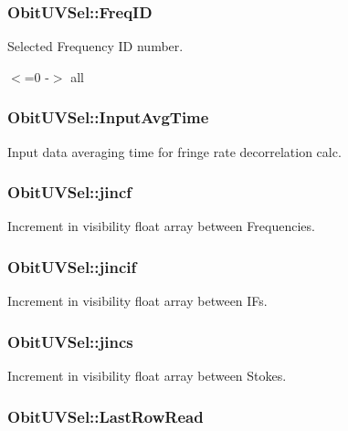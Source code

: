 \subsubsection{ {\bf Obit\-UVSel::Freq\-ID}}\label{structObitUVSel_o19}


Selected Frequency ID number. 

$<$=0 -$>$ all 
\subsubsection{ {\bf Obit\-UVSel::Input\-Avg\-Time}}\label{structObitUVSel_o57}


Input data averaging time for fringe rate decorrelation calc. 

\subsubsection{ {\bf Obit\-UVSel::jincf}}\label{structObitUVSel_o14}


Increment in visibility float array between Frequencies. 

\subsubsection{ {\bf Obit\-UVSel::jincif}}\label{structObitUVSel_o17}


Increment in visibility float array between IFs. 

\subsubsection{ {\bf Obit\-UVSel::jincs}}\label{structObitUVSel_o11}


Increment in visibility float array between Stokes. 

\subsubsection{ {\bf Obit\-UVSel::Last\-Row\-Read}}\label{structObitUVSel_o52}


